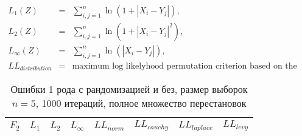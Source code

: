 \documentclass{article}
\begin{document}
\begin{eqnarray}
  \label{L1}
  L_1(Z)&=&\sum_{i,j=1}^{n}{\ln(1+|X_{i}-Y_{j}|)},\\
  \label{L2}
  L_2(Z)&=&\sum_{i,j=1}^{n}{\ln(1+|X_{i}-Y_{j}|^2)},\\
  \label{Linf}
  L_\infty(Z)&=&\sum_{i,j=1}^{n}{\ln(|X_{i}-Y_{j}|)},\\
  \label{LL}
  LL_{distribution} &=& \text{maximum log likelyhood permutation criterion based on the distribution}
\end{eqnarray}

\begin{longtable}{|c|c|c|c|c|c|c|c|}
  \caption{Ошибки 1 рода с рандомизацией и без, размер выборок $n=5$, 1000 итераций, полное множество перестановок}
  \\ \hline
  $F_2$ & $L_{1}$ & $L_{2}$ & $L_{\infty}$ & $LL_{norm}$ & $LL_{cauchy}$ & $LL_{laplace}$ & $LL_{levy}$ \\ \hline
  
  \hline
\end{longtable}
\end{document}
